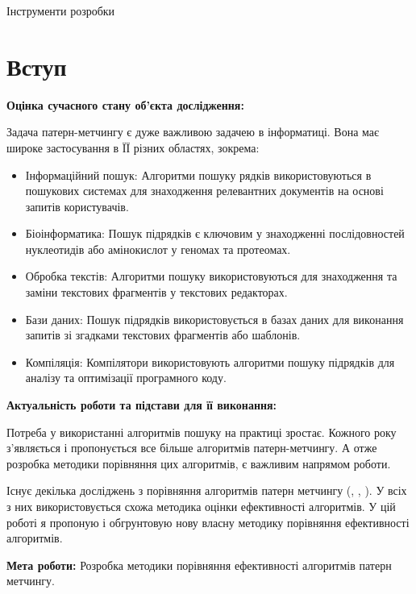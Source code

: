\documentclass[a4paper,14pt]{extarticle} %
\begin{document}
	Інструменти розробки
	\newpage

    \tableofcontents


    \newpage
    
    \section*{Вступ}

	\textbf{Оцінка сучасного стану об’єкта дослідження:}
	
	Задача патерн-метчингу є дуже важливою задачею в інформатиці. Вона має широке застосування в ЇЇ різних областях, зокрема:
\begin{itemize}
    \item Інформаційний пошук: Алгоритми пошуку рядків використовуються в пошукових системах для
	знаходження релевантних документів на основі запитів користувачів.
    \item Біоінформатика: Пошук підрядків є ключовим у знаходженні послідовностей нуклеотидів або амінокислот у геномах та протеомах. \cite{dna}
    \item Обробка текстів: Алгоритми пошуку використовуються для знаходження та заміни текстових фрагментів у текстових редакторах.
    \item Бази даних: Пошук підрядків використовується в базах даних для виконання запитів зі згадками текстових фрагментів або шаблонів.
    \item Компіляція: Компілятори використовують алгоритми пошуку підрядків для аналізу та оптимізації програмного коду.

\end{itemize}


\textbf{Актуальність роботи та підстави для її виконання:}

Потреба у використанні алгоритмів пошуку на практиці зростає. Кожного року з'являється і пропонується все більше алгоритмів патерн-метчингу. А отже розробка методики порівняння цих алгоритмів, є важливим напрямом роботи.

Існує декілька досліджень з порівняння алгоритмів патерн метчингу (\cite{smart}, \cite{exact}, \cite{experiment}). У всіх з них використовується схожа методика оцінки ефективності алгоритмів.
У цій роботі я пропоную і обгрунтовую нову власну методику порівняння ефективності алгоритмів.

\textbf{Мета роботи:} Розробка методики порівняння ефективності алгоритмів патерн метчингу.
\end{document}
